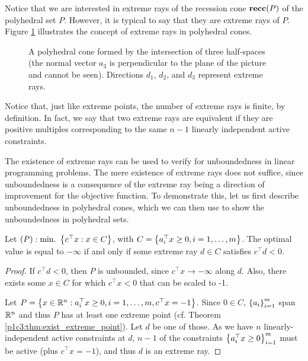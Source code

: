 Notice that we are interested in extreme rays of the recession cone ${\bf recc} (P)$ of the polyhedral set $P$. However, it is typical to say that they are extreme rays of $P$. Figure \ref{p1c6:fig:extreme_rays} illustrates the concept of extreme rays in polyhedral cones.

\begin{figure}[h]
	\caption{A polyhedral cone formed by the intersection of three half-spaces (the normal vector $a_3$ is perpendicular to the plane of the picture and cannot be seen). Directions $d_1$, $d_2$, and $d_3$ represent extreme rays.} \label{p1c6:fig:extreme_rays}	
\end{figure}

Notice that, just like extreme points, the number of extreme rays is finite, by definition. In fact, we say that two extreme rays are equivalent if they are positive multiples corresponding to the same $n-1$ linearly independent active constraints.


The existence of extreme rays can be used to verify for unboundedness in linear programming problems. The mere existence of extreme rays does not suffice, since unboundedness is a consequence of the extreme ray being a direction of improvement for the objective function. To demonstrate this, let us first describe unboundedness in polyhedral cones, which we can then use to show the unboundedness in polyhedral sets.

\begin{theorem}\label{p1c6:thm:unb_cones}
	Let $(P) : \mathop{\text{min.~}}\left\{ c^\top x : x \in C \right \}$, with $C = \left\{ a_i^\top x \geq 0, i = 1,\dots,m \right \}$. The optimal value is equal to $-\infty$ if and only if some extreme ray $d \in C$ satisfies $c^\top d < 0$.
\end{theorem}

\begin{proof}
	If $c^\top d < 0$, then $P$ is unbounded, since $c^\top x \rightarrow -\infty$ along $d$. Also, there exists some $x \in C$ for which $c^\top x < 0$ that can be scaled to -1.
	
	Let $P = \left\{ x \in \mathbb{R}^n : a_i^\top x \geq 0, i =1,\dots,m , c^\top x = -1 \right \}$. Since $0 \in C$, $\left\{ a_i \right \}_{i=1}^m$ span $\mathbb{R}^n$ and thus $P$ has at least one extreme point (cf. Theorem \ref{p1c3:thm:exist_extreme_point}). Let $d$ be one of those. As we have $n$ linearly-independent active constraints at $d$, $n-1$ of the constraints $\left\{ a_i^\top x \geq 0 \right \}_{i =1}^m$ must be active (plus $c^\top x = -1$), and thus $d$ is an extreme ray.
\end{proof}

